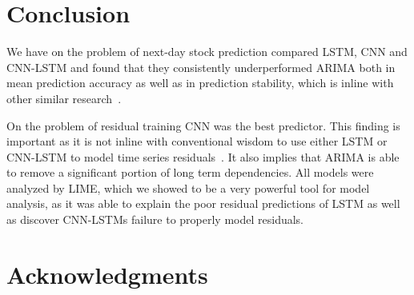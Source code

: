 \documentclass[12pt,journal,compsoc]{IEEEtran}
\begin{document}
\section{Conclusion}
\par We have on the problem of next-day stock prediction compared LSTM, CNN and CNN-LSTM and found that they consistently underperformed ARIMA both in mean prediction accuracy as well as in prediction stability, which is inline with other similar research~\cite{carbon}.
\par On the problem of residual training CNN was the best predictor. 
This finding is important as it is not inline with conventional wisdom to use either LSTM or CNN-LSTM to model time series residuals~\cite{carbon}. 
It also implies that ARIMA is able to remove a significant portion of long term dependencies. 
All models were analyzed by LIME, which we showed to be a very powerful tool for model analysis, as it was able to explain the poor residual predictions of LSTM as well as discover CNN-LSTMs failure to properly model residuals. 


%


\ifCLASSOPTIONcompsoc
  \section*{Acknowledgments}
\else
\end{document}
